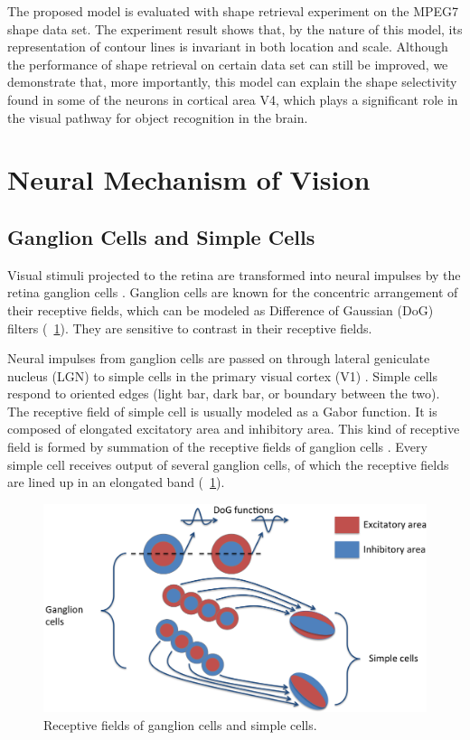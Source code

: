 \documentclass[10pt,letterpaper]{article}
\begin{document}
The proposed model is evaluated with shape retrieval experiment on the MPEG7 shape data set.
The experiment result shows that, by the nature of this model, 
its representation of contour lines is invariant in both location and scale.
Although the performance of shape retrieval on certain data set can still be improved,
we demonstrate that, more importantly,
this model can explain the shape selectivity found in some of the neurons in cortical area V4, 
which plays a significant role in the visual pathway for object recognition in the brain.

\section{Neural Mechanism of Vision}

\subsection{Ganglion Cells and Simple Cells}

Visual stimuli projected to the retina are transformed into neural impulses
by the retina ganglion cells \cite{enroth1966}.
Ganglion cells are known for the concentric arrangement of their receptive fields,
which can be modeled as Difference of Gaussian (DoG) filters
(\figurename~\ref{fig:1}).
They are sensitive to contrast in their receptive fields.

Neural impulses from ganglion cells are passed on through lateral geniculate nucleus (LGN)
to simple cells in the primary visual cortex (V1) \cite{hubel1962}.
Simple cells respond to oriented edges (light bar, dark bar, or boundary between the two).
The receptive field of simple cell is usually modeled as a Gabor function.
It is composed of elongated excitatory area and inhibitory area.
This kind of receptive field is formed by summation of the receptive fields of ganglion cells
\cite{reid1995}.
Every simple cell receives output of several ganglion cells, of which the receptive fields
are lined up in an elongated band (\figurename~\ref{fig:1}).

\begin{figure}[ht]
\begin{center}
\includegraphics[width=0.95\linewidth]{images/fig1.png}
\end{center}
\caption{Receptive fields of ganglion cells and simple cells.} 
\label{fig:1}
\end{figure}
\end{document}
